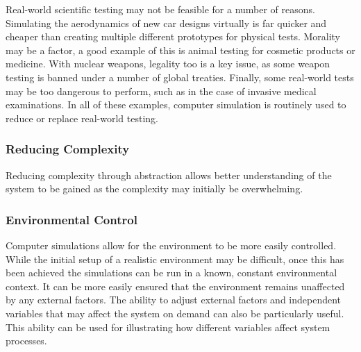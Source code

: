 \documentclass{UoYCSproject}
\begin{document}
Real-world scientific testing may not be feasible for a number of reasons.
Simulating the aerodynamics of new car designs virtually is far quicker and cheaper than creating multiple different prototypes for physical tests.
Morality may be a factor, a good example of this is animal testing for cosmetic products or medicine.
With nuclear weapons, legality too is a key issue, as some weapon testing is banned under a number of global treaties\cite{partial_nuclear_test_ban_treaty, threshold_test_ban_treaty}.
Finally, some real-world tests may be too dangerous to perform, such as in the case of invasive medical examinations.
In all of these examples, computer simulation is routinely used to reduce or replace real-world testing.

\subsubsection{Reducing Complexity}
Reducing complexity through abstraction allows better understanding of the system to be gained as the complexity may initially be overwhelming.


\subsubsection{Environmental Control}
Computer simulations allow for the environment to be more easily controlled.
While the initial setup of a realistic environment may be difficult, once this has been achieved the simulations can be run in a known, constant environmental context.
It can be more easily ensured that the environment remains unaffected by any external factors.
The ability to adjust external factors and independent variables that may affect the system on demand can also be particularly useful.
This ability can be used for illustrating how different variables affect system processes.

\end{document}
